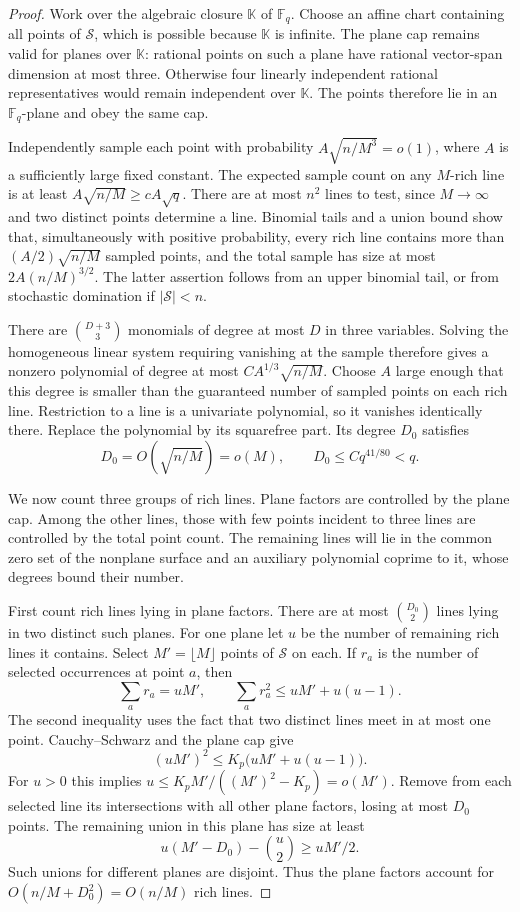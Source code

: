 \begin{proof}
Work over the algebraic closure $\mathbb K$ of $\mathbb F_q$.
Choose an affine chart containing all points of $\mathcal S$, which
is possible because $\mathbb K$ is infinite. The plane cap remains
valid for planes over $\mathbb K$: rational points on such a plane
have rational vector-span dimension at most three. Otherwise four
linearly independent rational representatives would remain independent
over $\mathbb K$. The points therefore lie in an $\mathbb F_q$-plane
and obey the same cap.

Independently sample each point with probability
$A\sqrt{n/M^3}=o(1)$, where $A$ is a sufficiently large fixed
constant. The expected sample count on any $M$-rich line is at least
$A\sqrt{n/M}\geq cA\sqrt q$. There are at most $n^2$ lines to
test, since $M\to\infty$ and two distinct points determine a line.
Binomial tails and a union bound show that, simultaneously with
positive probability, every rich line contains more than
$(A/2)\sqrt{n/M}$ sampled points, and the total sample has size at
most $2A(n/M)^{3/2}$. The latter assertion follows from an upper
binomial tail, or from stochastic domination if $|\mathcal S|<n$.

There are $\binom{D+3}{3}$ monomials of degree at most $D$ in three
variables. Solving the homogeneous linear system requiring vanishing
at the sample therefore gives a nonzero polynomial of degree at most
$CA^{1/3}\sqrt{n/M}$. Choose $A$ large enough that this degree is
smaller than the guaranteed number of sampled points on each rich
line. Restriction to a line is a univariate polynomial, so it vanishes
identically there. Replace the polynomial by its squarefree part.
Its degree $D_0$ satisfies
\begin{equation}\label{geom:interpolating-degree}
 D_0=O(\sqrt{n/M})=o(M),\qquad
 D_0\leq Cq^{41/80}<q.
\end{equation}

We now count three groups of rich lines. Plane factors are controlled
by the plane cap. Among the other lines, those with few points incident
to three lines are controlled by the total point count. The remaining
lines will lie in the common zero set of the nonplane surface and an
auxiliary polynomial coprime to it, whose degrees bound their number.

First count rich lines lying in plane factors. There are at most
$\binom{D_0}{2}$ lines lying in two distinct such planes. For one
plane let $u$ be the number of remaining rich lines it contains.
Select $M'=\lfloor M\rfloor$ points of $\mathcal S$ on each.
If $r_a$ is the number of selected occurrences at point $a$, then
\[
 \sum_a r_a=uM',\qquad
 \sum_a r_a^2\leq uM'+u(u-1).
\]
The second inequality uses the fact that two distinct lines meet in
at most one point. Cauchy--Schwarz and the plane cap give
\[
 (uM')^2\leq K_p\bigl(uM'+u(u-1)\bigr).
\]
For $u>0$ this implies
$u\leq K_pM'/((M')^2-K_p)=o(M')$. Remove from each selected line
its intersections with all other plane factors, losing at most $D_0$
points. The remaining union in this plane has size at least
\[
 u(M'-D_0)-\binom u2\geq uM'/2.
\]
Such unions for different planes are disjoint. Thus the plane factors
account for $O(n/M+D_0^2)=O(n/M)$ rich lines.


\end{proof}
